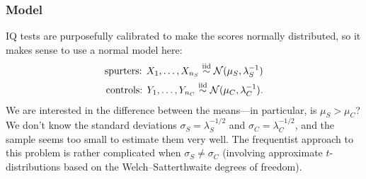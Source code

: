\documentclass[12pt]{article}
\begin{document}
\subsubsection*{Model}
IQ tests are purposefully calibrated to make the scores normally distributed, so it makes sense to use a normal model here:
\begin{align*}
\text{spurters: } X_1,\dotsc,X_{n_S}\stackrel{\mathrm{iid}}{\sim} \mathcal{N}(\mu_S,\lambda_S^{-1})\\
\text{controls: } Y_1,\dotsc,Y_{n_C}\stackrel{\mathrm{iid}}{\sim} \mathcal{N}(\mu_C,\lambda_C^{-1}).
\end{align*}
We are interested in the difference between the means---in particular, is $\mu_S>\mu_C$?
We don't know the standard deviations $\sigma_S=\lambda_S^{-1/2}$ and $\sigma_C=\lambda_C^{-1/2}$, and the sample seems too small to estimate them very well.
The frequentist approach to this problem is rather complicated when $\sigma_S\neq\sigma_C$ (involving approximate $t$-distributions based on the Welch--Satterthwaite degrees of freedom). 
\end{document}

